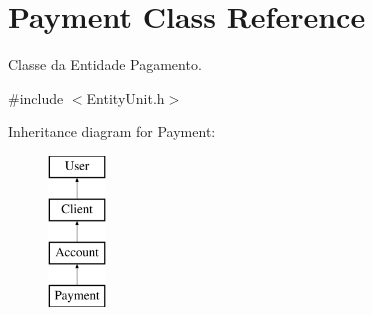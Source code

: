 \hypertarget{classPayment}{\section{Payment Class Reference}
\label{classPayment}
}


Classe da Entidade Pagamento.  




{\ttfamily \#include $<$Entity\-Unit.\-h$>$}

Inheritance diagram for Payment\-:\begin{figure}[H]
\begin{center}
\leavevmode
\includegraphics[height=4.000000cm]{classPayment}
\end{center}
\end{figure}
